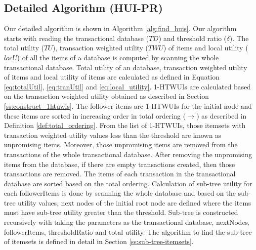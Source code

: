 \documentclass[11pt,openright]{report}
\begin{document}
\subsection{Detailed Algorithm (HUI-PR)}
Our detailed algorithm is shown in Algorithm \ref{alg:find_huis}. Our algorithm starts with reading the transactional database ($TD$) and threshold ratio ($\delta$). The total utility ($TU$), transaction weighted utility ($TWU$) of items and local utility ($locU$) of all the items of a database is computed by scanning the whole transactional database. Total utility of an database, transaction weighted utility of items and local utility of items are calculated as defined in Equation \ref{eq:totalUtil}, \ref{eq:tranUtil} and \ref{eq:local_utility}. 1-HTWUIs are calculated based on the transaction weighted utility obtained as described in Section \ref{ss:construct_1htuwis}. The follower items are 1-HTWUIs for the initial node and these items are sorted in increasing order in total ordering ($\rightarrow$) as described in Definition \ref{def:total_ordering}. From the list of 1-HTWUIs, those itemsets with transaction weighted utility values less than the threshold are known as unpromising items. Moreover, those unpromising items are removed from the transactions of the whole transactional database. After removing the unpromising items from the database, if there are empty transactions created, then those transactions are removed. The items of each transaction in the transactional database are sorted based on the total ordering. Calculation of sub-tree utility for each followerItems is done by scanning the whole database and based on the sub-tree utility values, next nodes of the initial root node are defined where the items must have sub-tree utility greater than the threshold. Sub-tree is constructed recursively with taking the parameters as the transactional database, nextNodes, followerItems, thresholdRatio and total utility. The algorithm to find the sub-tree of itemsets is defined in detail in Section \ref{ss:sub-tree-itemsets}.
\end{document}
